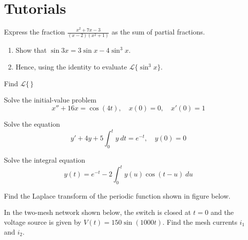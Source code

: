 \section{Tutorials}

\begin{mdframed}
    \vspace{-0.25cm}
    \hspace{-0.25cm}
    \begin{Exercise}
        Express the fraction $\displaystyle \frac{x^2 + 7x - 3}{(x-2)(x^2 + 1)}$ as the sum of partial fractions.
    \end{Exercise}

    \begin{Exercise}
        \begin{enumerate}
            \item Show that $\sin 3x = 3 \sin x - 4\sin^3x$.
            \item Hence, using the identity to evaluate $\mathcal{L}\{\sin^3 x\}$.
        \end{enumerate}
    \end{Exercise}

    \begin{Exercise}
        Find $\displaystyle \mathcal{L} \biggl\{\frac{}{}\biggr\}$
    \end{Exercise}

    \begin{Exercise}
        Solve the initial-value problem
        \[
            x'' + 16x = \cos(4t),\quad x(0) = 0,\quad x'(0) =1
        \]
    \end{Exercise}

    \begin{Exercise}
        Solve the equation
        \[
            y' + 4y + 5\int_{0}^{t} y \> dt = e^{-t}, \quad y(0) = 0
        \]
    \end{Exercise}

    \begin{Exercise}
        Solve the integral equation
        \[
            y(t) = e^{-t} - 2\int_{0}^{t} y(u) \cos(t-u) \> du
        \]
    \end{Exercise}

    \begin{Exercise}
        Find the Laplace transform of the periodic function shown in figure below.

        
    \end{Exercise}

    \begin{Exercise}
        In the two-mesh network shown below, the switch is closed at $t = 0$ and the voltage source is given by
    $V(t) = 150 \sin(1000t)$. Find the mesh currents $i_1$ and $i_2$.


\end{Exercise}
\end{mdframed}
